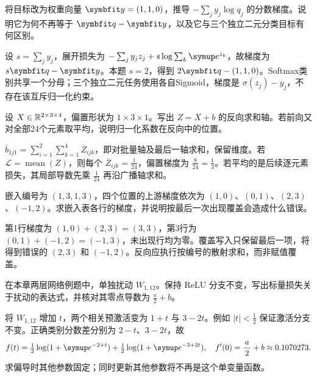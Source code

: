 \begin{exercises}
\begin{exercise}\optional 将目标改为权重向量 $\vect{y}=(1,1,0)$，推导 $-\sum_jy_j\log q_j$ 的分数梯度。说明它为何不再等于 $\vect{q}-\vect{y}$，以及它与三个独立二元分类目标有何区别。

\begin{solution}
设 $s=\sum_jy_j$，展开损失为 $-\sum_jy_jz_j+s\log\sum_k\conste{}^{z_k}$，故梯度为 $s\vect{q}-\vect{y}$。本题 $s=2$，得到 $2\vect{q}-(1,1,0)$。Softmax类别共享一个分母；三个独立二元任务使用各自Sigmoid，梯度是 $\sigma(z_j)-y_j$，不存在该互斥归一化约束。
\end{solution}
\end{exercise}

\begin{exercise} 设 $X\in\mathbb{R}^{2\times3\times4}$，偏置形状为 $1\times3\times1$。写出 $Z=X+b$ 的反向求和轴。若前向又对全部24个元素取平均，说明归一化系数在反向中的位置。

\begin{solution}
$\overline b_{1j1}=\sum_{i=1}^2\sum_{k=1}^4\overline Z_{ijk}$，即对批量轴及最后一轴求和，保留维度。若 $\mathcal L=\operatorname{mean}(Z)$，则每个 $\overline Z_{ijk}=\frac{1}{24}$，偏置梯度为 $\frac{8}{24}=\frac{1}{3}$。若平均的是后续逐元素损失，其局部导数先乘 $\frac{1}{24}$ 再沿广播轴求和。
\end{solution}
\end{exercise}

\begin{exercise} 嵌入编号为 $(1,3,1,3)$，四个位置的上游梯度依次为 $(1,0)$、$(0,1)$、$(2,3)$、$(-1,2)$。求嵌入表各行的梯度，并说明按最后一次出现覆盖会造成什么错误。

\begin{solution}
第1行梯度为 $(1,0)+(2,3)=(3,3)$，第3行为 $(0,1)+(-1,2)=(-1,3)$，未出现行均为零。覆盖写入只保留最后一项，将得到错误的 $(2,3)$ 和 $(-1,2)$。反向应执行按编号的散射求和，而非赋值覆盖。
\end{solution}
\end{exercise}

\begin{exercise}\optional 在本章两层网络例题中，单独扰动 $W_{1,12}$。保持 ReLU 分支不变，写出标量损失关于扰动的表达式，并核对其零点导数为 $\frac{a}{2}+b$。

\begin{solution}
将 $W_{1,12}$ 增加 $t$，两个相关预激活变为 $1+t$ 与 $3-2t$。例如 $|t|<\frac{1}{2}$ 保证激活分支不变。正确类别分数差分别为 $2-t$、$3-2t$，故
\[
f(t)=\tfrac12\log(1+\conste{}^{-2+t})+\tfrac12\log(1+\conste{}^{-3+2t}),
\quad f'(0)=\frac{a}{2}+b\approx0.1070273.
\]
求偏导时其他参数固定；同时更新其他参数将不再是这个单变量函数。
\end{solution}
\end{exercise}


\end{exercises}
